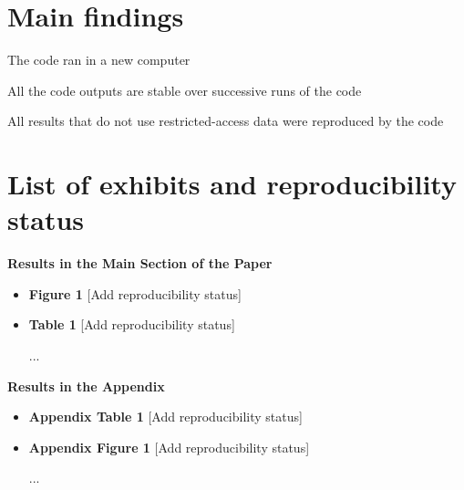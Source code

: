 \documentclass{tufte-handout}
\newcommand{\cmark}{\ding{51}}%
\newcommand{\xmark}{\ding{55}}%
\newcommand{\done}{\rlap{$\square$}{\raisebox{2pt}{\large\hspace{1pt}\cmark}}%
\hspace{-2.5pt}}
\newcommand{\pending}{\rlap{$\square$}{\large\hspace{1pt}\xmark}}
\begin{document}
\section{Main findings}
\label{main-findings}

\begin{todolist}


    \item The code ran in a new computer

    \item All the code outputs are stable over successive runs of the code

    \item All results that do not use restricted-access data were reproduced by the code
     
\end{todolist}

\section{List of exhibits and reproducibility status}
\label{output-list}


\textbf{Results in the Main Section of the Paper}


\begin{itemize}

\item \textbf{Figure 1} \textcolor{OliveGreen}{[Add reproducibility status]}

\item \textbf{Table 1} \textcolor{OliveGreen}{[Add reproducibility status]}

...

\end{itemize}

\textbf{Results in the Appendix}


\begin{itemize}

\item \textbf{Appendix Table 1} \textcolor{OliveGreen}{[Add reproducibility status]}

\item \textbf{Appendix Figure 1} \textcolor{OliveGreen}{[Add reproducibility status]}

...

\end{itemize}
\end{document}
